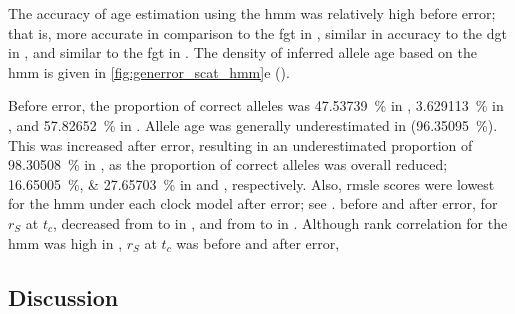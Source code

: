 %

%

The accuracy of age estimation using the  \gls{hmm} was relatively high before error; that is, more accurate in comparison to the \gls{fgt} in \ClockM, similar in accuracy to the \gls{dgt} in \ClockR, and similar to the \gls{fgt} in \ClockC.
The density of inferred allele age based on the \gls{hmm} is given in \cref{fig:generror_scat_hmm}{e} ().

Before error, the proportion of correct alleles was \SI{47.53739}{\percent} in \ClockM, \SI{3.629113}{\percent} in \ClockR, and \SI{57.82652}{\percent} in \ClockC.
Allele age was generally underestimated in \ClockR (\SI{96.35095}{\percent}).
This was increased after error, resulting in an underestimated proportion of \SI{98.30508}{\percent} in \ClockR, as the proportion of correct alleles was overall reduced; \SIlist{16.65005;27.65703}{\percent} in \ClockM and \ClockC, respectively.
Also, \gls{rmsle} scores were lowest for the \gls{hmm} under each clock model after error; see .
 before and after error, for $r_S$ at $t_c$, decreased from  to  in \ClockM, and from  to  in \ClockC.
Although rank correlation for the \gls{hmm} was high in \ClockR, \eg $r_S$ at $t_c$ was  before and  after error, 

% 
%


%

%




%
\subsection{Discussion}
%




